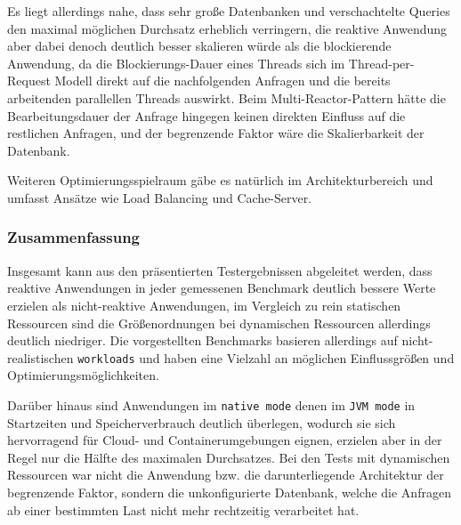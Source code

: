 Es liegt allerdings nahe, dass sehr große Datenbanken und verschachtelte Queries den maximal möglichen Durchsatz erheblich verringern,
die reaktive Anwendung aber dabei denoch deutlich besser skalieren würde als die blockierende Anwendung, da die Blockierungs-Dauer
eines Threads sich im Thread-per-Request Modell direkt auf die nachfolgenden Anfragen und die bereits arbeitenden parallellen Threads
auswirkt.
Beim Multi-Reactor-Pattern hätte die Bearbeitungsdauer der Anfrage hingegen keinen direkten Einfluss auf die restlichen Anfragen, und der
begrenzende Faktor wäre die Skalierbarkeit der Datenbank.

Weiteren Optimierungsspielraum gäbe es natürlich im Architekturbereich und umfasst Ansätze wie Load Balancing und Cache-Server.
\subsubsection{Zusammenfassung}
\label{subsubsec:auswertung_zusammenfassung}
Insgesamt kann aus den präsentierten Testergebnissen abgeleitet werden, dass reaktive Anwendungen in jeder gemessenen
Benchmark deutlich bessere Werte erzielen als nicht-reaktive Anwendungen, im Vergleich zu rein statischen Ressourcen
sind die Größenordnungen bei dynamischen Ressourcen allerdings deutlich niedriger.
Die vorgestellten Benchmarks basieren allerdings auf nicht-realistischen \verb|workloads| und haben eine Vielzahl an möglichen
Einflussgrößen und Optimierungsmöglichkeiten.

Darüber hinaus sind Anwendungen im \verb|native mode| denen im \verb|JVM mode| in Startzeiten und Speicherverbrauch deutlich überlegen,
wodurch sie sich hervorragend für Cloud- und Containerumgebungen eignen, erzielen aber in der Regel nur die Hälfte des maximalen Durchsatzes.
Bei den Tests mit dynamischen Ressourcen war nicht die Anwendung bzw. die darunterliegende Architektur der begrenzende Faktor,
sondern die unkonfigurierte Datenbank, welche die Anfragen ab einer bestimmten Last nicht mehr rechtzeitig verarbeitet hat.

